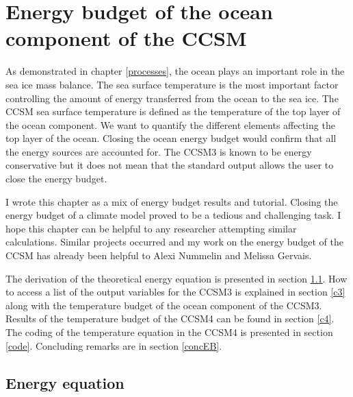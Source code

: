 \section{Energy budget of the ocean component of the CCSM}
\label{vert}

As demonstrated in chapter \ref{processes}, the ocean plays an important role in the sea ice mass balance. The sea surface temperature is the most important factor controlling the amount of energy transferred from the ocean to the sea ice. The CCSM sea surface temperature is defined as the temperature of the top layer of the ocean component. We want to quantify the different elements affecting the top layer of the ocean. Closing the ocean energy budget would confirm that all the energy sources are accounted for. The CCSM3 is known to be energy conservative \citep{SG4} but it does not mean that the standard output allows the user to close the energy budget.

I wrote this chapter as a mix of energy budget results and tutorial. Closing the energy budget of a climate model proved to be a tedious and challenging task. I hope this chapter can be helpful to any researcher attempting similar calculations. Similar projects occurred and my work on the energy budget of the CCSM has already been helpful to Alexi Nummelin and Melissa Gervais. 


The derivation of the theoretical energy equation is presented in section \ref{energeq}. How to access a list of the output variables for the CCSM3 is explained in section \ref{c3} along with the temperature budget of the ocean component of the CCSM3. Results of the temperature budget of the CCSM4 can be found in section \ref{c4}. The coding of the temperature equation in the CCSM4 is presented in section \ref{code}. Concluding remarks are in section \ref{concEB}.

\subsection{Energy equation}\label{energeq}

